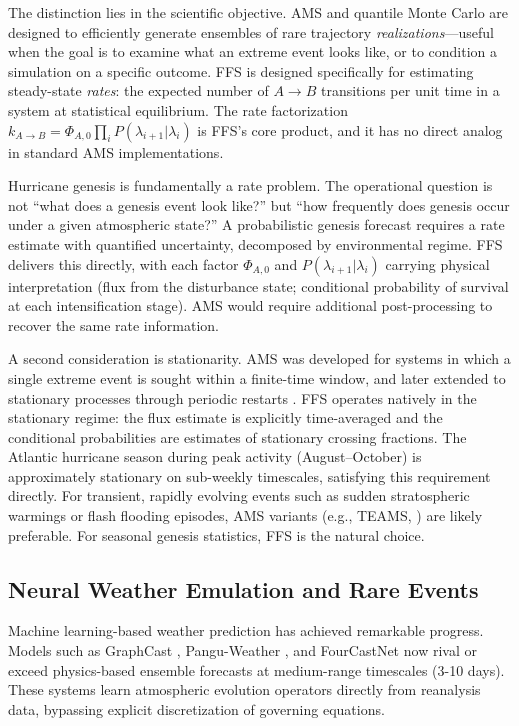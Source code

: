 \documentclass[11pt]{article}
\begin{document}
The distinction lies in the scientific objective. AMS and quantile Monte Carlo are designed to efficiently generate ensembles of rare trajectory \textit{realizations}---useful when the goal is to examine what an extreme event looks like, or to condition a simulation on a specific outcome. FFS is designed specifically for estimating steady-state \textit{rates}: the expected number of $A \to B$ transitions per unit time in a system at statistical equilibrium. The rate factorization $k_{A\to B} = \Phi_{A,0} \prod_i P(\lambda_{i+1}|\lambda_i)$ is FFS's core product, and it has no direct analog in standard AMS implementations.

Hurricane genesis is fundamentally a rate problem. The operational question is not ``what does a genesis event look like?'' but ``how frequently does genesis occur under a given atmospheric state?'' A probabilistic genesis forecast requires a rate estimate with quantified uncertainty, decomposed by environmental regime. FFS delivers this directly, with each factor $\Phi_{A,0}$ and $P(\lambda_{i+1}|\lambda_i)$ carrying physical interpretation (flux from the disturbance state; conditional probability of survival at each intensification stage). AMS would require additional post-processing to recover the same rate information.

A second consideration is stationarity. AMS was developed for systems in which a single extreme event is sought within a finite-time window, and later extended to stationary processes through periodic restarts \citep{brehier2016unbiasedness}. FFS operates natively in the stationary regime: the flux estimate is explicitly time-averaged and the conditional probabilities are estimates of stationary crossing fractions. The Atlantic hurricane season during peak activity (August--October) is approximately stationary on sub-weekly timescales, satisfying this requirement directly. For transient, rapidly evolving events such as sudden stratospheric warmings or flash flooding episodes, AMS variants (e.g., TEAMS, \citet{finkel2024bringing}) are likely preferable. For seasonal genesis statistics, FFS is the natural choice.

\subsection{Neural Weather Emulation and Rare Events}

Machine learning-based weather prediction has achieved remarkable progress. Models such as GraphCast \citep{lam2023graphcast}, Pangu-Weather \citep{bi2023pangu}, and FourCastNet \citep{pathak2022fourcastnet} now rival or exceed physics-based ensemble forecasts at medium-range timescales (3-10 days). These systems learn atmospheric evolution operators directly from reanalysis data, bypassing explicit discretization of governing equations.
\end{document}
